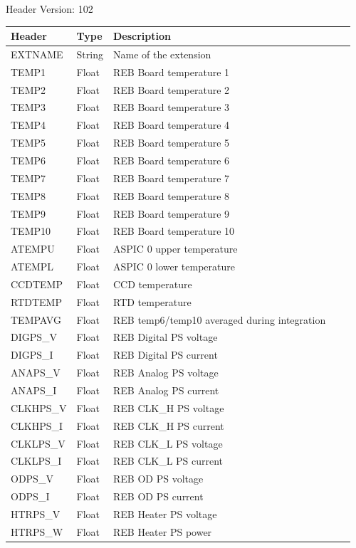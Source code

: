 Header Version: 102


\begin{longtable}{l l l l l}

\hline
Header & Type & Description \\
\hline
EXTNAME & String & Name of the extension \\
TEMP1 & Float & REB Board temperature 1 \\
TEMP2 & Float & REB Board temperature 2 \\
TEMP3 & Float & REB Board temperature 3 \\
TEMP4 & Float & REB Board temperature 4 \\
TEMP5 & Float & REB Board temperature 5 \\
TEMP6 & Float & REB Board temperature 6 \\
TEMP7 & Float & REB Board temperature 7 \\
TEMP8 & Float & REB Board temperature 8 \\
TEMP9 & Float & REB Board temperature 9 \\
TEMP10 & Float & REB Board temperature 10 \\
ATEMPU & Float & ASPIC 0 upper temperature \\
ATEMPL & Float & ASPIC 0 lower temperature \\
CCDTEMP & Float & CCD temperature \\
RTDTEMP & Float & RTD temperature \\
TEMPAVG & Float & REB temp6/temp10 averaged during integration \\
DIGPS\_V & Float & REB Digital PS voltage  \\
DIGPS\_I & Float & REB Digital PS current  \\
ANAPS\_V & Float & REB Analog PS voltage  \\
ANAPS\_I & Float & REB Analog PS current  \\
CLKHPS\_V & Float & REB CLK\_H PS voltage  \\
CLKHPS\_I & Float & REB CLK\_H PS current  \\
CLKLPS\_V & Float & REB CLK\_L PS voltage  \\
CLKLPS\_I & Float & REB CLK\_L PS current  \\
ODPS\_V & Float & REB OD PS voltage  \\
ODPS\_I & Float & REB OD PS current  \\
HTRPS\_V & Float & REB Heater PS voltage  \\
HTRPS\_W & Float & REB Heater PS power  \\

\end{longtable}
